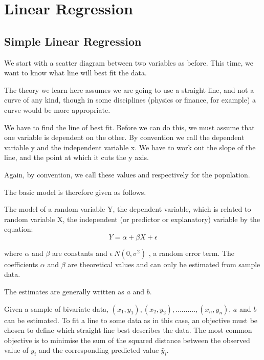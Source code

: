 \documentclass[a4paper,12pt]{article}
\begin{document}
\chapter{Linear Regression}
\section{Simple Linear Regression}

We start with a scatter diagram between two variables as before. This time, we want
to know what line will best fit the data.

The theory we learn here assumes we are going to use a straight line, and not a curve of any kind, though in some disciplines (physics or finance, for example) a curve would be more appropriate.

We have to find the line of best fit. Before we can do this, we must assume that one
variable is dependent on the other. By convention we call the dependent variable y
and the independent variable x. We have to work out the slope of the line, and the
point at which it cuts the y axis.

Again, by convention, we call these values and respectively for the population.

The basic model is therefore given as follows.

The model of a random variable Y, the dependent variable, which is related to random
variable X, the independent (or predictor or explanatory) variable by the equation:
\begin{equation}
Y = \alpha + \beta X + \epsilon
\end{equation}

where $\alpha$ and $\beta$ are constants and $\epsilon ~ N ( 0,\sigma^2)$ , a random error term. The
coefficients $\alpha$ and $\beta$  are theoretical values and can only be estimated from sample data.

The estimates are generally written as $a$ and $b$.

Given a sample of bivariate data, $(x_1,y_1),(x_2,y_2) ,.........., (x_n,y_n)$, $a$ and $b$ can be
estimated. To fit a line to some data as in this case, an objective must be chosen to
define which straight line best describes the data. The most common objective is to
minimise the sum of the squared distance between the observed value of $y_i$
and the corresponding predicted value $\hat{y}_i$.
\end{document}
